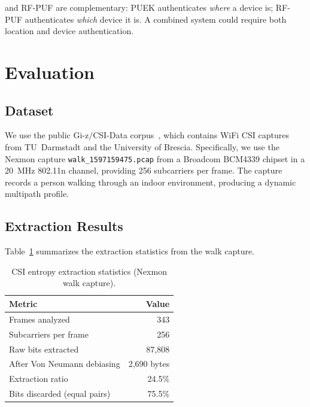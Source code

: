 \puek and RF-PUF are complementary: PUEK authenticates \emph{where} a device is; RF-PUF authenticates \emph{which} device it is.
A combined system could require both location and device authentication.


\section{Evaluation}
\label{sec:evaluation}

\subsection{Dataset}
\label{subsec:dataset}

We use the public Gi-z/CSI-Data corpus~\cite{gringoli2019csidata, gringoli2019freeCSI}, which contains WiFi CSI captures from TU~Darmstadt and the University of Brescia.
Specifically, we use the Nexmon capture \texttt{walk\_1597159475.pcap} from a Broadcom BCM4339 chipset in a 20~MHz 802.11n channel, providing 256 subcarriers per frame.
The capture records a person walking through an indoor environment, producing a dynamic multipath profile.

\subsection{Extraction Results}
\label{subsec:extraction-results}

Table~\ref{tab:extraction} summarizes the extraction statistics from the walk capture.

\begin{table}[t]
\centering
\caption{CSI entropy extraction statistics (Nexmon walk capture).}
\label{tab:extraction}
\small
\begin{tabular}{@{}lr@{}}
\toprule
\textbf{Metric} & \textbf{Value} \\
\midrule
Frames analyzed & 343 \\
Subcarriers per frame & 256 \\
Raw bits extracted & 87{,}808 \\
After Von Neumann debiasing & 2{,}690 bytes \\
Extraction ratio & 24.5\% \\
Bits discarded (equal pairs) & 75.5\% \\
\bottomrule
\end{tabular}
\end{table}

